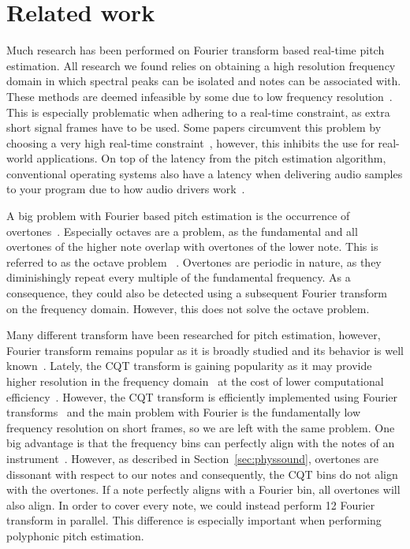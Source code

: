 \documentclass[10pt,twocolumn]{article}
\begin{document}
\section{Related work}  \label{sec:related}
Much research has been performed on Fourier transform based real-time pitch estimation. All research we found relies on obtaining a high resolution frequency domain in which spectral peaks can be isolated and notes can be associated with. These methods are deemed infeasible by some due to low frequency resolution~\cite{fourierlimit}.%
This is especially problematic when adhering to a real-time constraint, as extra short signal frames have to be used. Some papers circumvent this problem by choosing a very high real-time constraint~\cite{sloomboi, sloomboi2}, however, this inhibits the use for real-world applications. On top of the latency from the pitch estimation algorithm, conventional operating systems also have a latency when delivering audio samples to your program due to how audio drivers work~\cite{oslatency}.

A big problem with Fourier based pitch estimation is the occurrence of overtones~\cite{oud}. Especially octaves are a problem, as the fundamental and all overtones of the higher note overlap with overtones of the lower note. This is referred to as the octave problem~
\cite{octave}. Overtones are periodic in nature, as they diminishingly repeat every multiple of the fundamental frequency. As a consequence, they could also be detected using a subsequent Fourier transform~\cite{doublefourier} on the frequency domain. However, this does not solve the octave problem.

Many different transform have been researched for pitch estimation, however, Fourier transform remains popular as it is broadly studied and its behavior is well known~\cite{survey}. Lately, the CQT transform is gaining popularity as it may provide higher resolution in the frequency domain~\cite{cqtres} at the cost of lower computational efficiency~\cite{cqtslow}. However, the CQT transform is efficiently implemented using Fourier transforms~\cite{cqtfft} and the main problem with Fourier is the fundamentally low frequency resolution on short frames, so we are left with the same problem. One big advantage is that the frequency bins can perfectly align with the notes of an instrument~\cite{cqtalign}. However, as described in Section~\ref{sec:physsound}, overtones are dissonant with respect to our notes and consequently, the CQT bins do not align with the overtones. If a note perfectly aligns with a Fourier bin, all overtones will also align. In order to cover every note, we could instead perform 12 Fourier transform in parallel. This difference is especially important when performing polyphonic pitch estimation.
\end{document}
